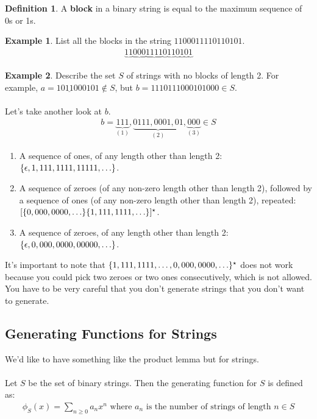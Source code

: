 \documentclass[]{article}
\theoremstyle{definition}
\newtheorem*{defn}{Definition}
\newtheorem{ex}{Example}[section]
\DeclarePairedDelimiter{\set}{\lbrace}{\rbrace}
\begin{document}
		\begin{defn}
			A \textbf{block} in a binary string is equal to the maximum sequence of 0s or 1s.
		\end{defn}
		
		\begin{ex}
			List all the blocks in the string $1100011110110101$.
			\begin{align*}
				\underbrace{11} \underbrace{000} \underbrace{1111} \underbrace{0} \underbrace{11} \underbrace{0} \underbrace{1} \underbrace{0} \underbrace{1}
			\end{align*}
		\end{ex}

		\begin{ex}
			Describe the set $S$ of strings with no blocks of length 2. For example, $a = 10\underline{11}000101 \not \in S$, but $b = 1110111000101000 \in S$.
			\\ \\
			Let's take another look at $b$.
			\begin{align*}
				b = \underbrace{111}_{(1)},\underbrace{0111,0001,01}_{(2)},\underbrace{000}_{(3)} \in S
			\end{align*}

			\begin{enumerate}
				\item A sequence of ones, of any length other than length 2: $\set{\epsilon, 1, 111, 1111, 11111, \ldots }$.
				\item A sequence of zeroes (of any non-zero length other than length 2), followed by a sequence of ones (of any non-zero length other than length 2), repeated: $[ \set{0, 000, 0000, \ldots } \set{1, 111, 1111, \ldots } ]^\star$.
				\item A sequence of zeroes, of any length other than length 2: $\set{\epsilon, 0, 000, 0000, 00000, \ldots }$.
			\end{enumerate}

			It's important to note that $\set{1, 111, 1111, \ldots, 0, 000, 0000, \ldots }^\star$ does not work because you could pick two zeroes or two ones consecutively, which is not allowed. You have to be very careful that you don't generate strings that you don't want to generate.
		\end{ex}

		\subsection{Generating Functions for Strings}
			We'd like to have something like the product lemma but for strings.
			\\ \\
			Let $S$ be the set of binary strings. Then the generating function for $S$ is defined as:
			\begin{align*}
				\phi_S(x) = \sum_{n \ge 0} a_n x^n \text{ where } a_n \text{ is the number of strings of length } n \in S
			\end{align*}
\end{document}
